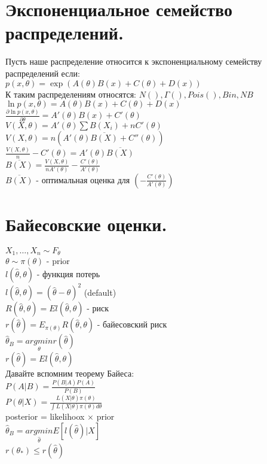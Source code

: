 \documentclass{article}
\newcommand\0{\mathbb{0}}
\newcommand\1{\mathbb{1}}
\newcommand{\pat}{\partial}
\begin{document}
\section{Экспоненциальное семейство распределений.}
Пусть наше распределение относится к экспоненциальному семейству распределений если:\\
$p(x, \theta) = \exp(A(\theta)B(x) + C(\theta) + D(x))$\\
К таким распределениям относятся: $N(), \Gamma(), Pois(), Bin, NB$\\
$\ln{p(x, \theta)} = A(\theta)B(x) + C(\theta) + D(x)$\\
$\frac{\pat \ln{p(x, \theta)}}{\pat \theta} = A'(\theta)B(x) + C'(\theta)$\\
$V(X, \theta) = A'(\theta)\displaystyle\sum B(X_i) + nC'(\theta)$\\
$V(X, \theta) = n(A'(\theta)\overline{B(X)} + C''(\theta))$\\
$\frac{V(X, \theta)}{n} - C'(\theta) = A'(\theta)\overline{B(X)}$\\
$\overline{B(X)} = \frac{V(X, \theta)}{nA'(\theta)} - \frac{C'(\theta)}{A'(\theta)}$\\
$\overline{B(X)}$ - оптимальная оценка для $(-\frac{C'(\theta)}{A'(\theta)})$\\
\section{Байесовские оценки.}
$X_1, \dots, X_n \sim F_\theta$\\
$\theta \sim \pi(\theta)$ - prior\\
$l(\widehat{\theta}, \theta)$ - функция потерь\\
$l(\widehat{\theta}, \theta) = (\widehat{\theta} - \theta)^2$ (default)\\
$R(\widehat{\theta}, \theta) = El(\widehat{\theta}, \theta)$ - риск\\
$r(\widehat{\theta}) = E_{\pi(\theta)}R(\widehat{\theta}, \theta)$ - байесовский риск\\
$\widehat{\theta}_B = \underset{\theta}{argmin}r(\widehat{\theta})$\\
$r(\widehat{\theta}) = El(\widehat{\theta}, \theta)$\\
Давайте вспомним теорему Байеса:\\
$P(A | B) = \frac{P(B | A)P(A)}{P(B)}$\\
$P(\theta | X) = \frac{L(X|\theta)\pi(\theta)}{\displaystyle\int L(X | \theta)\pi(\theta)d\theta}$\\
posterior = likelihoox $\times$ prior\\
$\widehat{\theta}_B = \underset{\widehat{\theta}}{argmin}E[l(\widehat{\theta}) | X]$\\
$r(\theta_*) \leq r(\widehat{\theta})$\\
\end{document}
